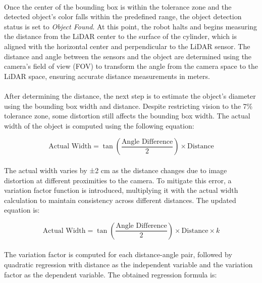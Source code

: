 \paragraph*{}
Once the center of the bounding box is within the tolerance zone and the detected object's color falls within the predefined range, the object detection status is set to \textit{Object Found}. At this point, the robot halts and begins measuring the distance from the LiDAR center to the surface of the cylinder, which is aligned with the horizontal center and perpendicular to the LiDAR sensor. The distance and angle between the sensors and the object are determined using the camera's field of view (FOV) to transform the angle from the camera space to the LiDAR space, ensuring accurate distance measurements in meters.

\paragraph*{}
After determining the distance, the next step is to estimate the object's diameter using the bounding box width and distance. Despite restricting vision to the 7\% tolerance zone, some distortion still affects the bounding box width. The actual width of the object is computed using the following equation:

\begin{equation}
\text{Actual Width} = \tan\left(\frac{\text{Angle Difference}}{2}\right) \times \text{Distance}
\end{equation}

\paragraph*{}
The actual width varies by ±2 cm as the distance changes due to image distortion at different proximities to the camera. To mitigate this error, a variation factor function is introduced, multiplying it with the actual width calculation to maintain consistency across different distances. The updated equation is:

\begin{equation}
\text{Actual Width} = \tan\left(\frac{\text{Angle Difference}}{2}\right) \times \text{Distance} \times k
\end{equation}

\paragraph*{}
The variation factor is computed for each distance-angle pair, followed by quadratic regression with distance as the independent variable and the variation factor as the dependent variable. The obtained regression formula is:

